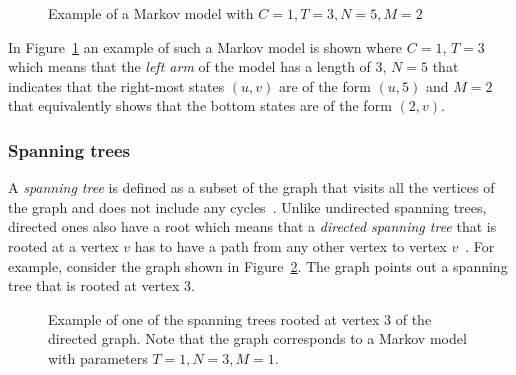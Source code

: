 \begin{figure}[H]
    \centering
    \scalebox{0.7}{
        
        }
    \caption{Example of a Markov model with \(C=1, T=3, N=5, M=2\)}
    \label{fig:Markov_1352_example_for_closed_form}
\end{figure}

In Figure~\ref{fig:Markov_1352_example_for_closed_form} an example of such a
Markov model is shown where \(C=1\), \(T=3\) which means that the \textit{left
arm} of the model has a length of \(3\), \(N=5\) that indicates that the
right-most states \((u,v)\) are of the form \((u,5)\) and \(M=2\) that
equivalently shows that the bottom states are of the form \((2,v)\).

\subsubsection{Spanning trees}

A \textit{spanning tree} is defined as a subset of the graph that visits all
the vertices of the graph and does not include any
cycles~\cite{bollobas1998modern}.
Unlike undirected spanning trees, directed ones also have a root which means
that a \textit{directed spanning tree} that is rooted at a vertex \(v\) has to
have a path from any other vertex to vertex \(v\)~\cite{levine2011sandpile}.
For example, consider the graph shown in Figure~\ref{fig:example_spanning_tree}.
The graph points out a spanning tree that is rooted at vertex 3.


\begin{figure}[H]
    \centering
    \caption{Example of one of the spanning trees rooted at vertex 3 of the
    directed graph. Note that the graph corresponds to a Markov model with
    parameters \(T=1, N=3, M=1\).}
    \label{fig:example_spanning_tree}
\end{figure}

